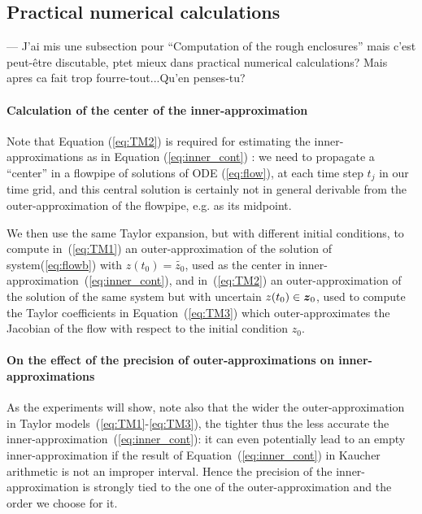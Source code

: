 \documentclass{sig-alternate-05-2015} %
\newcommand\ForAuthors[1]%
 {\par\smallskip                     %
  \begin{center}%
   \fbox%
   {\parbox{0.9\linewidth}%
    {\raggedright\sc--- #1}%
   }%
  \end{center}%
  \par\smallskip                     %
 }
\newtheorem{remark}{Remark}
\begin{document}
\subsection{Practical numerical calculations}
\label{practicalissues}

\ForAuthors{J'ai mis une subsection pour ``Computation of the rough
enclosures'' mais c'est peut-\^etre discutable, ptet mieux dans practical
numerical calculations? Mais apres ca fait trop fourre-tout...Qu'en penses-tu?}

\paragraph{Calculation of the center of the inner-approximation}

Note that Equation (\ref{eq:TM2}) is required for estimating the inner-approximations as in Equation (\ref{eq:inner_cont}) : we need to propagate a ``center'' in 
a flowpipe of solutions of ODE (\ref{eq:flow}), at each time step $t_j$ in our time
grid, and this central solution is certainly not in general derivable from the 
outer-approximation of the flowpipe, e.g. as its midpoint. 
 
We then use the same Taylor expansion, but with different initial conditions, to compute in~(\ref{eq:TM1}) an outer-approximation of the solution of system(\ref{eq:flowb}) 
with $z(t_0)=\tilde{z_0}$, used as the center in inner-approximation~(\ref{eq:inner_cont}), and  in~(\ref{eq:TM2}) an outer-approximation of the solution of the 
same system but with uncertain $z(t_0) \in \z_0$, used to compute the Taylor coefficients in Equation~(\ref{eq:TM3}) which outer-approximates the Jacobian of the flow 
with respect to the initial condition $z_0$. 


\paragraph{On the effect of the precision of outer-approximations on inner-approximations}

As the experiments will show, note also that 
the wider the outer-approximation in Taylor models~(\ref{eq:TM1}-\ref{eq:TM3}), the tighter thus the less accurate the inner-approximation~(\ref{eq:inner_cont}): 
it can even potentially lead to an empty inner-approximation if the result of Equation~(\ref{eq:inner_cont}) in Kaucher arithmetic is not an improper interval. Hence the
precision of the inner-approximation is strongly tied to the one of the outer-appro\-ximation and the order we choose for it. 
\end{document}
